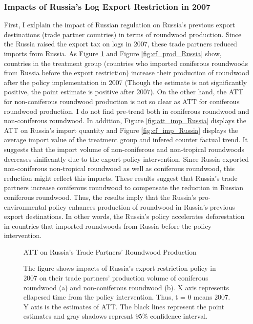 \documentclass[a4paper,12pt]{article}
\begin{document}
\subsubsection{Impacts of Russia's Log Export Restriction in 2007}
First, I exlplain the impact of Russian regulation on Russia's previous export destinations (trade partner countries) in terms of roundwood production. Since the Russia raised the export tax on logs in 2007, these trade partners reduced imports from Russia. As Figure \ref{fig:att_prod_Russia} and Figure \ref{fig:cf_prod_Russia} show, countries in the treatment group (countries who imported coniferous roundwoods from Russia before the export restriction) increase their production of roundwood after the policy implementation in 2007 (Though the estimate is not significantly positive, the point estimate is positive after 2007). On the other hand, the ATT for non-coniferous roundwood production is not so clear as ATT for coniferous roundwood production. I do not find pre-trend both in coniferous roundwood and non-coniferous roundwood. In addition, Figure \ref{fig:att_imp_Russia} displays the ATT on Russia's import quantity and Figure \ref{fig:cf_imp_Russia} displays the average import value of the treatment group and infered counter factual trend. It suggests that the import volume of non-coniferous and non-tropical roundwoods decreases sinificantly due to the export policy intervention. Since Russia exported non-coniferous non-tropical roundwood as well as coniferous roundwood, this reduction might reflect this impacts. These results suggest that Russia's trade partners increase coniferous roundwood to compensate the reduction in Russian coniferous roundwood. Thus, the results imply that the Russia's pro-environmental policy enhances production of roundwood in Russia's previous export destinations. In other words, the Russia's policy accelerates deforestation in countries that imported roundwoods from Russia before the policy intervention. 

\begin{figure}[htbp] 
    \centering
    \caption{ATT on Russia's Trade Partners' Roundwood Production}
    \caption*{\small{The figure shows impacts of Russia's export restriction policy in 2007 on their trade partners' production volume of coniferous roundwood (a) and non-coniferous roundwood (b). X axis represents ellapesed time from the policy intervention. Thus, t = 0 means 2007. Y axis is the estimates of ATT. The black lines represent the point estimates and gray shadows represnt 95\% confidence interval.}}
    \label{fig:att_prod_Russia}
\end{figure}
\end{document}
